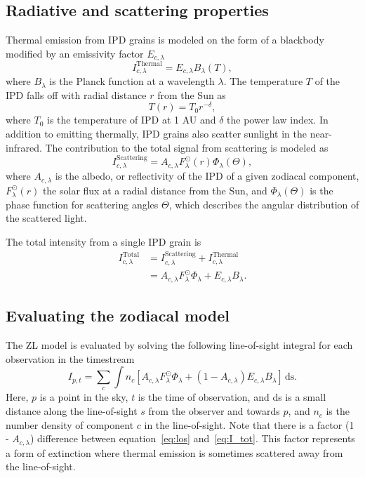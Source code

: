 \documentclass{aa}
\begin{document}
\subsection{Radiative and scattering properties}
Thermal emission from IPD grains is modeled on the form of a blackbody
 modified by an emissivity factor $E_{c, \lambda}$
\begin{equation}
    I^\mathrm{Thermal}_{c,\lambda} = E_{c,\lambda} B_\lambda(T),
\end{equation}
where $B_\lambda$ is the Planck function at a wavelength $\lambda$. The 
temperature $T$ of the IPD falls off with radial distance $r$ from the 
Sun as
\begin{equation}
    T(r) = T_0 r^{-\delta},
\end{equation}
where $T_0$ is the temperature of IPD at 1 AU and $\delta$ the power law 
index. In addition to emitting thermally, IPD grains also scatter 
sunlight in the near-infrared. The contribution to the total signal from 
scattering is modeled as
\begin{equation}\label{eq: scat_term}
    I^\mathrm{Scattering}_{c, \lambda} = A_{c, \lambda} F_\lambda^\odot(r) \Phi_\lambda(\Theta),
\end{equation}
where $A_{c, \lambda}$ is the albedo, or reflectivity of the IPD of a 
given zodiacal component, $F_\lambda^\odot(r)$ the solar flux at a 
radial distance from the Sun, and $\Phi_\lambda(\Theta)$ is the phase 
function for scattering angles $\Theta$, which describes the angular 
distribution of the scattered light.

The total intensity from a single IPD grain is
\begin{align}\label{eq:I_tot}
    I^\mathrm{Total}_{c, \lambda} &= I^\mathrm{Scattering}_{c,\lambda} + I^\mathrm{Thermal}_{c,\lambda}\\
    &= A_{c, \lambda} F_\lambda^\odot \Phi_\lambda + E_{c,\lambda} B_\lambda.
\end{align}

\subsection{Evaluating the zodiacal model}
The ZL model is evaluated by solving the following line-of-sight 
integral for each observation in the timestream
\begin{equation}\label{eq:los}
    I_{p,t} = \sum_c \int n_c \left[  A_{c, \lambda} F_\lambda^\odot \Phi_\lambda + \left( 1 - A_{c, \lambda} \right) E_{c,\lambda} B_\lambda \right]\,\mathrm {ds}.
\end{equation}
Here, $p$ is a point in the sky, $t$ is the time of observation, and ds 
is a small distance along the line-of-sight $s$ from the observer and 
towards $p$, and $n_c$ is the number density of component $c$ in the 
line-of-sight. Note that there is a factor (1 - $A_{c, \lambda}$) 
difference between equation~\eqref{eq:los} and~\eqref{eq:I_tot}. This 
factor represents a form of extinction where thermal emission is 
sometimes scattered away from the line-of-sight. 
\end{document}
